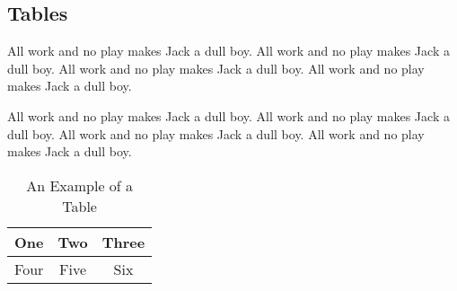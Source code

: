 
%
%

%
%

\subsection{Tables}
\label{sec:discussion_tables}

All work and no play makes Jack a dull boy.
All work and no play makes Jack a dull boy.
All work and no play makes Jack a dull boy.
All work and no play makes Jack a dull boy.

All work and no play makes Jack a dull boy.
All work and no play makes Jack a dull boy.
All work and no play makes Jack a dull boy.
All work and no play makes Jack a dull boy.

\begin{table}[h]
\caption{An Example of a Table}
\label{tab:table_a}
\begin{center}
\begin{tabular}{|c||c|c|}
\hline
One & Two & Three\\
\hline
Four & Five & Six\\
\hline
\end{tabular}
\end{center}
\end{table}
